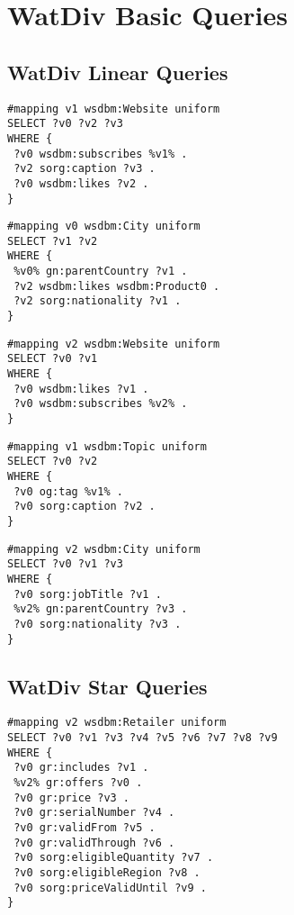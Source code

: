 \section{WatDiv Basic Queries}
\label{queries:watdivbasic}

\subsection{WatDiv Linear Queries}
\label{queries:watdivbasic:linear}

\begin{lstlisting}[caption={L1},label=query:L1]
#mapping v1 wsdbm:Website uniform
SELECT ?v0 ?v2 ?v3
WHERE {
 ?v0 wsdbm:subscribes %v1% .
 ?v2 sorg:caption ?v3 .
 ?v0 wsdbm:likes ?v2 .
}
\end{lstlisting}

\begin{lstlisting}[caption={L2},label=query:L2]
#mapping v0 wsdbm:City uniform
SELECT ?v1 ?v2
WHERE {
 %v0% gn:parentCountry ?v1 .
 ?v2 wsdbm:likes wsdbm:Product0 .
 ?v2 sorg:nationality ?v1 .
}
\end{lstlisting}

\begin{lstlisting}[caption={L3},label=query:L3]
#mapping v2 wsdbm:Website uniform
SELECT ?v0 ?v1
WHERE {
 ?v0 wsdbm:likes ?v1 .
 ?v0 wsdbm:subscribes %v2% .
}
\end{lstlisting}

\begin{lstlisting}[caption={L4},label=query:L4]
#mapping v1 wsdbm:Topic uniform
SELECT ?v0 ?v2
WHERE {
 ?v0 og:tag %v1% .
 ?v0 sorg:caption ?v2 .
}
\end{lstlisting}

\begin{lstlisting}[caption={L5},label=query:L5]
#mapping v2 wsdbm:City uniform
SELECT ?v0 ?v1 ?v3
WHERE {
 ?v0 sorg:jobTitle ?v1 .
 %v2% gn:parentCountry ?v3 .
 ?v0 sorg:nationality ?v3 .
}
\end{lstlisting}

\subsection{WatDiv Star Queries}
\label{queries:watdivbasic:star}

\begin{lstlisting}[caption={S1},label=query:S1]
#mapping v2 wsdbm:Retailer uniform
SELECT ?v0 ?v1 ?v3 ?v4 ?v5 ?v6 ?v7 ?v8 ?v9
WHERE {
 ?v0 gr:includes ?v1 .
 %v2% gr:offers ?v0 .
 ?v0 gr:price ?v3 .
 ?v0 gr:serialNumber ?v4 .
 ?v0 gr:validFrom ?v5 .
 ?v0 gr:validThrough ?v6 .
 ?v0 sorg:eligibleQuantity ?v7 .
 ?v0 sorg:eligibleRegion ?v8 .
 ?v0 sorg:priceValidUntil ?v9 .
}
\end{lstlisting}

